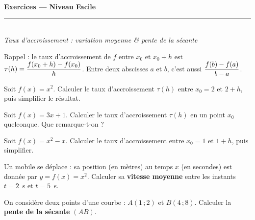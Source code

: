 \pagestyle{fancy}\fancyhf{}
\fancyfoot[C]{\small\thepage}
\renewcommand{\headrulewidth}{0.8pt}



\begin{center}
{\LARGE\bfseries\color{primarydark} Exercices — Niveau Facile}\\[2pt]
{\color{primary}\rule{0.5\textwidth}{1.2pt}}\\[4pt]
{\small\itshape Taux d'accroissement : variation moyenne \& pente de la sécante}
\end{center}
\vspace{2mm}

\begin{cle}
Rappel : le taux d'accroissement de $f$ entre $x_0$ et $x_0+h$ est
$\displaystyle \tau(h)=\frac{f(x_0+h)-f(x_0)}{h}$. Entre deux abscisses $a$ et $b$,
c'est aussi $\displaystyle \frac{f(b)-f(a)}{b-a}$.
\end{cle}

\begin{exo}[1]
Soit $f(x)=x^2$. Calculer le taux d'accroissement $\tau(h)$ entre $x_0=2$ et $2+h$,
puis simplifier le résultat.
\end{exo}

\begin{exo}[2]
Soit $f(x)=3x+1$. Calculer le taux d'accroissement $\tau(h)$ en un point $x_0$
quelconque. Que remarque-t-on ?
\end{exo}

\begin{exo}[3]
Soit $f(x)=x^2-x$. Calculer le taux d'accroissement entre $x_0=1$ et $1+h$,
puis simplifier.
\end{exo}

\begin{exo}[4]
Un mobile se déplace : sa position (en mètres) au temps $x$ (en secondes) est
donnée par $y=f(x)=x^2$. Calculer sa \textbf{vitesse moyenne} entre les instants
$t=2$~s et $t=5$~s.
\end{exo}

\begin{exo}[5]
On considère deux points d'une courbe : $A(1\,;2)$ et $B(4\,;8)$.
Calculer la \textbf{pente de la sécante} $(AB)$.
\end{exo}


